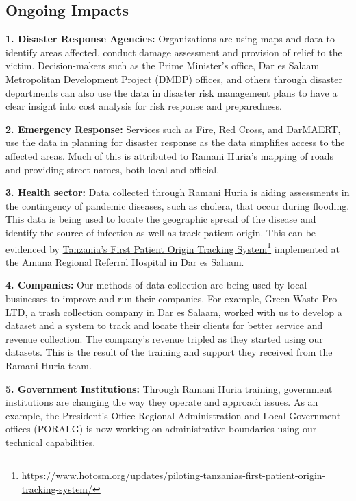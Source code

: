 \documentclass[a4paper,12pt,twoside]{article}
\begin{document}
\subsection{Ongoing Impacts}
\begin{multicols}{2}
\textbf{1. Disaster Response Agencies:} Organizations are using maps and data to identify areas affected, conduct damage assessment and provision of relief to the victim. Decision-makers such as the Prime Minister's office, Dar es Salaam Metropolitan Development Project (DMDP) offices, and others through disaster departments can also use the data in disaster risk management plans to have a clear insight into cost analysis for risk response and preparedness.

\textbf{2. Emergency Response:} Services such as Fire, Red Cross, and DarMAERT, use the data in planning for disaster response as the data simplifies access to the affected areas. Much of this is attributed to Ramani Huria's mapping of roads and  providing street names, both local and official.

\textbf{3. Health sector:} Data collected through Ramani Huria is aiding assessments in the contingency of pandemic diseases, such as cholera, that occur during flooding. This data is being used to locate the geographic spread of the disease and identify the source of infection as well as track patient origin. This can be evidenced by \href{https://www.hotosm.org/updates/piloting-tanzanias-first-patient-origin-tracking-system/}{Tanzania’s First Patient Origin Tracking System}\footnote{\url{https://www.hotosm.org/updates/piloting-tanzanias-first-patient-origin-tracking-system/}} implemented at the Amana Regional Referral Hospital in Dar es Salaam.

\textbf{4. Companies:} Our methods of data collection are being used by local businesses to improve and run their companies. For example, Green Waste Pro LTD, a trash collection company in Dar es Salaam, worked with us to develop a dataset and a system to track and locate their clients for better service and revenue collection. The company’s revenue tripled as they started using our datasets. This is the result of the training and support they received from the Ramani Huria team.

\textbf{5. Government Institutions:} Through Ramani Huria training, government institutions are changing the way they operate and approach issues. As an example, the President's Office Regional Administration and Local Government offices (PORALG) is now working on administrative boundaries using our technical capabilities.


\end{multicols}
\end{document}
